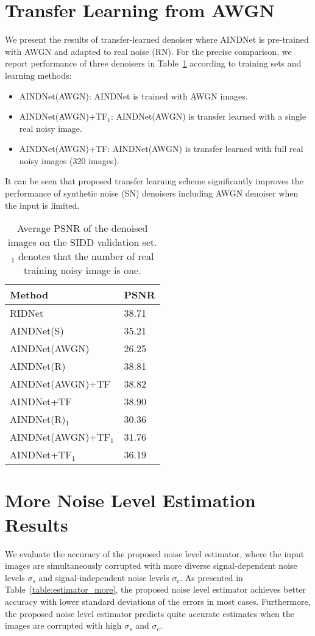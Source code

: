 \documentclass[10pt,twocolumn,letterpaper]{article}
\begin{document}
\section{Transfer Learning from AWGN}
We present the results of transfer-learned denoiser where AINDNet is pre-trained with AWGN and adapted to real noise (RN).
For the precise comparison, we report performance of three denoisers in Table~\ref{talbe:AWGN} according to training sets and learning methods:
\begin{itemize}
	\item AINDNet(AWGN): AINDNet is trained with AWGN images.	
	\item AINDNet(AWGN)+TF$_1$: AINDNet(AWGN) is transfer learned with a single real noisy image.		
	\item AINDNet(AWGN)+TF: AINDNet(AWGN) is transfer learned with full real noisy images (320 images).	
\end{itemize}
It can be seen that proposed transfer learning scheme significantly improves the performance of synthetic noise (SN) denoisers including AWGN denoiser when the input is limited. 

\begin{table}[h]
	\centering
	\caption{Average PSNR of the denoised images on the SIDD validation set. $_1$ denotes that the number of real training noisy image is one.}
	\label{talbe:AWGN}
	\begin{adjustbox}{width=0.6\linewidth}
		\begin{tabular}{ll}
			\toprule			
			Method &   PSNR   \\
			\midrule
			RIDNet~\cite{Anwar_2019_ICCV} & 38.71 \\
			\midrule
			AINDNet(S) & 35.21  \\
			AINDNet(AWGN) & 26.25 \\
			AINDNet(R) & 38.81 \\
			AINDNet(AWGN)+TF &  38.82  \\
			AINDNet+TF & 38.90\\			
			\midrule
			AINDNet(R)$_1$ & 30.36 \\
			AINDNet(AWGN)+TF$_1$ & 31.76 \\
			AINDNet+TF$_1$ & 36.19 \\			
			\bottomrule						
		\end{tabular}
	\end{adjustbox}
\end{table}

\section{More Noise Level Estimation Results}
We evaluate the accuracy of the proposed noise level estimator, where the input images are simultaneously corrupted with more diverse signal-dependent noise levels $\sigma_s$ and signal-independent noise levels $\sigma_c$. As presented in Table~\ref{table:estimator_more}, the proposed noise level estimator achieves better accuracy with lower standard deviations of the errors in most cases.
Furthermore, the proposed noise level estimator predicts quite accurate estimates when the images are corrupted with high $\sigma_s$ and $\sigma_c$.
\end{document}
